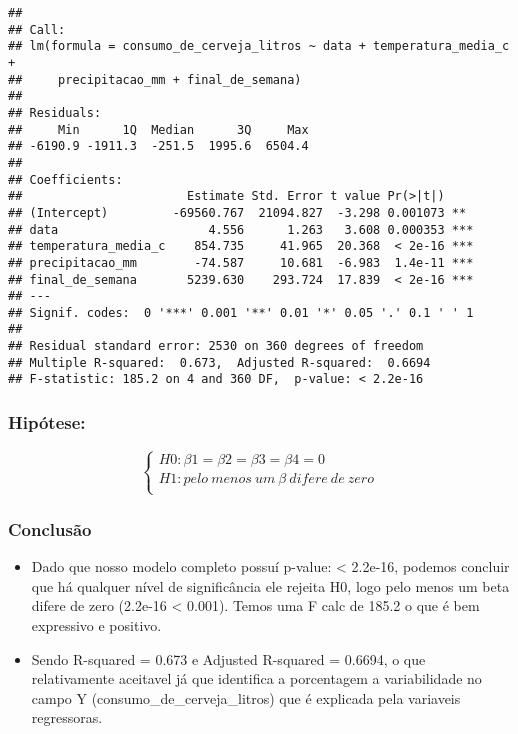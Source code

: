 \documentclass[
]{article}
\providecommand{\tightlist}{%
  \setlength{\itemsep}{0pt}\setlength{\parskip}{0pt}}
\begin{document}
\begin{verbatim}
## 
## Call:
## lm(formula = consumo_de_cerveja_litros ~ data + temperatura_media_c + 
##     precipitacao_mm + final_de_semana)
## 
## Residuals:
##     Min      1Q  Median      3Q     Max 
## -6190.9 -1911.3  -251.5  1995.6  6504.4 
## 
## Coefficients:
##                       Estimate Std. Error t value Pr(>|t|)    
## (Intercept)         -69560.767  21094.827  -3.298 0.001073 ** 
## data                     4.556      1.263   3.608 0.000353 ***
## temperatura_media_c    854.735     41.965  20.368  < 2e-16 ***
## precipitacao_mm        -74.587     10.681  -6.983  1.4e-11 ***
## final_de_semana       5239.630    293.724  17.839  < 2e-16 ***
## ---
## Signif. codes:  0 '***' 0.001 '**' 0.01 '*' 0.05 '.' 0.1 ' ' 1
## 
## Residual standard error: 2530 on 360 degrees of freedom
## Multiple R-squared:  0.673,  Adjusted R-squared:  0.6694 
## F-statistic: 185.2 on 4 and 360 DF,  p-value: < 2.2e-16
\end{verbatim}

\hypertarget{hipuxf3tese}{%
\subsubsection{Hipótese:}\label{hipuxf3tese}}

\[
\left\{ \begin{array}{rc} 
H0: \beta1 = \beta2 = \beta3 = \beta4 = 0 \\ 
H1: pelo \ menos \ um \ \beta \ difere \ de \ zero \\ 
\end{array}\right.
\]

\hypertarget{conclusuxe3o-1}{%
\subsubsection{Conclusão}\label{conclusuxe3o-1}}

\begin{itemize}
\tightlist
\item
  Dado que nosso modelo completo possuí p-value: \textless{} 2.2e-16,
  podemos concluir que há qualquer nível de significância ele rejeita
  H0, logo pelo menos um beta difere de zero (2.2e-16 \textless{}
  0.001). Temos uma F calc de 185.2 o que é bem expressivo e positivo.
\item
  Sendo R-squared = 0.673 e Adjusted R-squared = 0.6694, o que
  relativamente aceitavel já que identifica a porcentagem a
  variabilidade no campo Y (consumo\_de\_cerveja\_litros) que é
  explicada pela variaveis regressoras.
\end{itemize}
\end{document}
